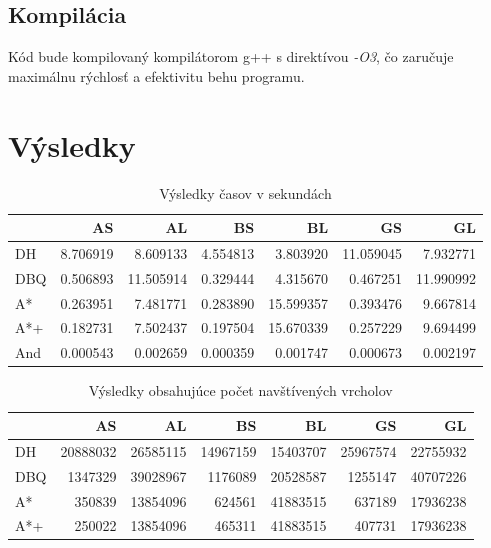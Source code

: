 \subsection{Kompilácia}
Kód bude kompilovaný kompilátorom g++ s direktívou \emph{-O3}, čo zaručuje maximálnu rýchlosť a efektivitu behu programu.


\section{Výsledky}

\begin{table}[H]
	\centering
	\begin{tabular}{|l | r|r|r|r|r|r|}
	\hline
	  & AS & AL & BS & BL & GS & GL \\
	\hline
	DH & 8.706919 & 8.609133 & 4.554813 & 3.803920 & 11.059045 & 7.932771 \\
	DBQ & 0.506893 & 11.505914 &  0.329444 & 4.315670 & 0.467251 & 11.990992 \\
	A* & 0.263951 & 7.481771 & 0.283890 & 15.599357 & 0.393476 & 9.667814 \\
	A*+  & 0.182731 & 7.502437 &  0.197504 & 15.670339 & 0.257229 & 9.694499\\
	And  &  0.000543 & 0.002659 & 0.000359 & 0.001747 & 0.000673& 0.002197\\
	\hline
	\end{tabular}
	\caption{Výsledky časov v sekundách}
	\label{fig:totaltime_result}
\end{table}


\begin{table}[H]
	\centering
	
	\begin{tabular}{|l | r|r|r|r|r|r|}
		\hline
		  & AS & AL & BS & BL & GS & GL \\
		\hline
		DH & 20888032 & 26585115 & 14967159 & 15403707 & 25967574 & 22755932 \\
		DBQ & 1347329 & 39028967 & 1176089 & 20528587 & 1255147 & 40707226 \\
		A* & 350839 & 13854096& 624561 & 41883515 & 637189 & 17936238 \\
		A*+ & 250022& 13854096 & 465311 & 41883515 & 407731 & 17936238 \\

		\hline
	\end{tabular}
		
	\caption{Výsledky obsahujúce počet navštívených vrcholov}
	\label{fig:verticesscanned_result}
\end{table}

